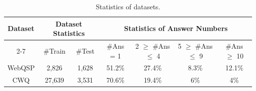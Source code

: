 
\begin{table}[h]
    \centering
    \caption{Statistics of datasets.}
    \label{tab:merged_stats}
    \begin{tabular}{@{}c|cc|cccc@{}}
    \toprule
    \multirow{2}{*}{Dataset} & \multicolumn{2}{c|}{Dataset Statistics} & \multicolumn{4}{c}{Statistics of Answer Numbers}                                \\ \cmidrule(l){2-7} 
                             & \#Train             & \#Test            & \#Ans = 1 & 2 $\geq$ \#Ans $\leq$ 4 & 5 $\geq$ \#Ans $\leq$ 9 & \#Ans $\geq$ 10 \\ \midrule
    WebQSP                   & 2,826               & 1,628             & 51.2\%    & 27.4\%                  & 8.3\%                   & 12.1\%          \\
    CWQ                      & 27,639              & 3,531             & 70.6\%    & 19.4\%                  & 6\%                     & 4\%             \\ \bottomrule
    \end{tabular}%
\end{table}
